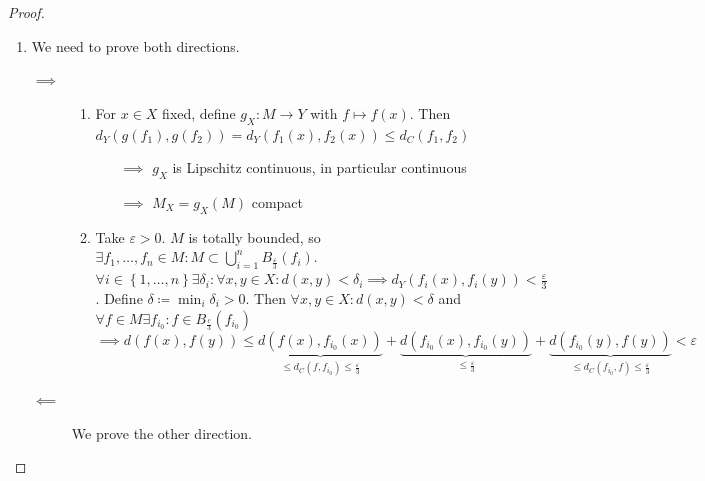 \documentclass{article}
\numberwithin{lecref}{section}
\newcommand{\Abs}[1]{\left|#1\right|}
\newcommand{\Set}[1]{\left\{#1\right\}}
\begin{document}
\begin{proof}
\begin{enumerate}
			In general, we have $\forall x, y, z \in (Z, d_Z)$ with $d_Z$ as a metric.
			\[ \Abs{d(x, z) - d(y, z)} \leq d(x, y) \]
			\begin{proof}
				\begin{align}
					d(x, z) &\leq d(x, y) + d(y, z) \implies d(x, z) - d(y, z) \leq d(x, y) \label{a} \\
					d(y, z) &\leq d(y, x) + d(x, z) \implies d(y, z) - d(x, z) \leq d(x, y) \label{b} \\
					\eqref{a} \text{ and } \eqref{b} &\implies \Abs{d(x, z) - d(y, z)} \leq d(x, y)
				\end{align}
			\end{proof}
			Consequently, $\forall z \in Z$, $x_n \to x$ in $Z$: $d(x_n, z) \to d(x, z)$
			since $\Abs{d(x_n, z) - d(x, z)} \leq d(x_n, x) \to 0$.

		\item We need to prove both directions.

			\begin{description}
				\item[$\implies$]
					\begin{enumerate}
						\item For $x \in X$ fixed, define $g_X: M \to Y$ with $f \mapsto f(x)$.
							Then $d_Y(g(f_1), g(f_2)) = d_Y(f_1(x), f_2(x)) \leq d_C(f_1, f_2)$
							\begin{itemize}
								\item[$\implies$] $g_X$ is Lipschitz continuous, in particular continuous
								\item[$\implies$] $M_X = g_X(M)$ compact
							\end{itemize}

						\item Take $\varepsilon > 0$. $M$ is totally bounded, so $\exists f_1, \dots, f_n \in M: M \subset \bigcup_{i=1}^n B_{\frac\varepsilon3}(f_i)$.
							$\forall i \in \Set{1, \dots, n} \exists \delta_i: \forall x, y \in X: d(x, y) < \delta_i \implies d_Y(f_i(x), f_i(y)) < \frac\varepsilon3$.
							Define $\delta \coloneqq \min_i \delta_i > 0$. Then $\forall x, y \in X: d(x, y) < \delta$ and $\forall f \in M \exists f_{i_0}: f \in B_{\frac c3}(f_{i_0})$
							\[ \implies d(f(x), f(y)) \leq \underbrace{d(f(x), f_{i_0}(x))}_{\leq d_C(f, f_{i_0}) \leq \frac\varepsilon3} + \underbrace{d(f_{i_0}(x), f_{i_0}(y))}_{\leq \frac\varepsilon3} + \underbrace{d(f_{i_0}(y), f(y))}_{\leq d_C(f_{i_0}, f) \leq \frac\varepsilon3} < \varepsilon \]
					\end{enumerate}
				\item[$\impliedby$]
					We prove the other direction.


\end{description}
\end{enumerate}
\end{proof}
\end{document}
